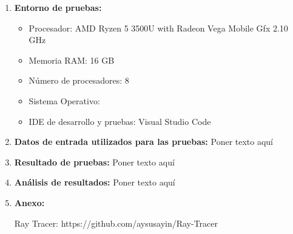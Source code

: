 \documentclass[12pt, letterpaper]{article}
\begin{document}
\begin{flushleft}
\begin{enumerate}
        \vspace{10mm}
        \item \textbf{Entorno de pruebas:}
            \begin{itemize}
                \item Procesador: AMD Ryzen 5 3500U with Radeon Vega Mobile Gfx  2.10 GHz
                \item Memoria RAM: 16 GB
                \item Número de procesadores: 8
                \item Sistema Operativo: 
                \item IDE de desarrollo y pruebas: Visual Studio Code
            \end{itemize}
        \item \textbf{Datos de entrada utilizados para las pruebas:}
        Poner texto aquí
        \item \textbf{Resultado de pruebas:}
        Poner texto aquí
        \item \textbf{Análisis de resultados:}
        Poner texto aquí
        \item \textbf{Anexo:}
        \begin{itemize}
            Ray Tracer: https://github.com/aysusayin/Ray-Tracer
        \end{itemize}
    \end{enumerate}
\end{flushleft}
\end{document}
